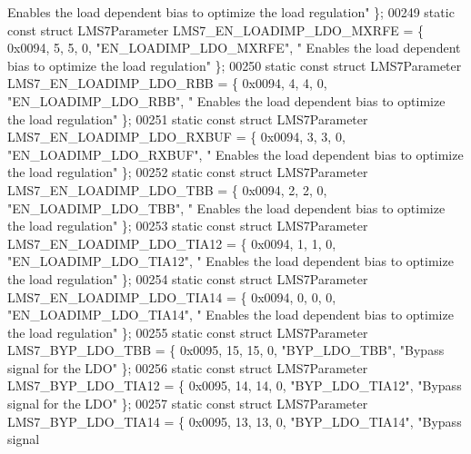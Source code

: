 \begin{DoxyCode}
{      Enables the load dependent bias to optimize the load regulation"} \};
00249 \textcolor{keyword}{static} \textcolor{keyword}{const} \textcolor{keyword}{struct }LMS7Parameter LMS7_EN_LOADIMP_LDO_MXRFE = \{ 0x0094, 5, 5, 0, \textcolor{stringliteral}{"EN\_LOADIMP\_LDO\_MXRFE"}, \textcolor{stringliteral}{"
      Enables the load dependent bias to optimize the load regulation"} \};
00250 \textcolor{keyword}{static} \textcolor{keyword}{const} \textcolor{keyword}{struct }LMS7Parameter LMS7_EN_LOADIMP_LDO_RBB = \{ 0x0094, 4, 4, 0, \textcolor{stringliteral}{"EN\_LOADIMP\_LDO\_RBB"}, \textcolor{stringliteral}{"
      Enables the load dependent bias to optimize the load regulation"} \};
00251 \textcolor{keyword}{static} \textcolor{keyword}{const} \textcolor{keyword}{struct }LMS7Parameter LMS7_EN_LOADIMP_LDO_RXBUF = \{ 0x0094, 3, 3, 0, \textcolor{stringliteral}{"EN\_LOADIMP\_LDO\_RXBUF"}, \textcolor{stringliteral}{"
      Enables the load dependent bias to optimize the load regulation"} \};
00252 \textcolor{keyword}{static} \textcolor{keyword}{const} \textcolor{keyword}{struct }LMS7Parameter LMS7_EN_LOADIMP_LDO_TBB = \{ 0x0094, 2, 2, 0, \textcolor{stringliteral}{"EN\_LOADIMP\_LDO\_TBB"}, \textcolor{stringliteral}{"
      Enables the load dependent bias to optimize the load regulation"} \};
00253 \textcolor{keyword}{static} \textcolor{keyword}{const} \textcolor{keyword}{struct }LMS7Parameter LMS7_EN_LOADIMP_LDO_TIA12 = \{ 0x0094, 1, 1, 0, \textcolor{stringliteral}{"EN\_LOADIMP\_LDO\_TIA12"}, \textcolor{stringliteral}{"
      Enables the load dependent bias to optimize the load regulation"} \};
00254 \textcolor{keyword}{static} \textcolor{keyword}{const} \textcolor{keyword}{struct }LMS7Parameter LMS7_EN_LOADIMP_LDO_TIA14 = \{ 0x0094, 0, 0, 0, \textcolor{stringliteral}{"EN\_LOADIMP\_LDO\_TIA14"}, \textcolor{stringliteral}{"
      Enables the load dependent bias to optimize the load regulation"} \};
00255 \textcolor{keyword}{static} \textcolor{keyword}{const} \textcolor{keyword}{struct }LMS7Parameter LMS7_BYP_LDO_TBB = \{ 0x0095, 15, 15, 0, \textcolor{stringliteral}{"BYP\_LDO\_TBB"}, \textcolor{stringliteral}{"Bypass signal for
       the LDO"} \};
00256 \textcolor{keyword}{static} \textcolor{keyword}{const} \textcolor{keyword}{struct }LMS7Parameter LMS7_BYP_LDO_TIA12 = \{ 0x0095, 14, 14, 0, \textcolor{stringliteral}{"BYP\_LDO\_TIA12"}, \textcolor{stringliteral}{"Bypass signal
       for the LDO"} \};
00257 \textcolor{keyword}{static} \textcolor{keyword}{const} \textcolor{keyword}{struct }LMS7Parameter LMS7_BYP_LDO_TIA14 = \{ 0x0095, 13, 13, 0, \textcolor{stringliteral}{"BYP\_LDO\_TIA14"}, \textcolor{stringliteral}{"Bypass signal
}
\end{DoxyCode}
